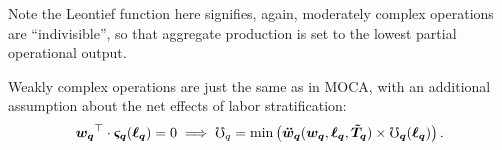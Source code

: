\documentclass[hidelinks, nonatbib]{elsarticle}
\begin{document}
\begin{axiom}
\begin{subaxiom}
    Note the Leontief function here signifies, again, moderately complex operations are ``indivisible'', so that aggregate production is set to the lowest partial operational output.
    \end{subaxiom}

    \begin{subaxiom}
        Weakly complex operations are just the same as in MOCA, with an additional assumption about the net effects of labor stratification:
        \begin{gather}
            \boldsymbol{w_{q}} ^ {\top}
            \cdot 
            \boldsymbol{\varsigma_{q}}(
                \boldsymbol{\ell_{q}}
            )
            =
            0
            \implies
            \mho_q
            =
            \min\left(
                \boldsymbol{\ddot{w}_{q}}(
                    \boldsymbol{w_{q}},
                    \boldsymbol{\ell_{q}},
                    \boldsymbol{\tilde{T}_{q}}
                )
                \times
                \boldsymbol{\mho_{q}}(
                    \boldsymbol{\ell_{q}}
                )
            \right)
            .
    \end{gather}


\end{subaxiom}
\end{axiom}
\end{document}
